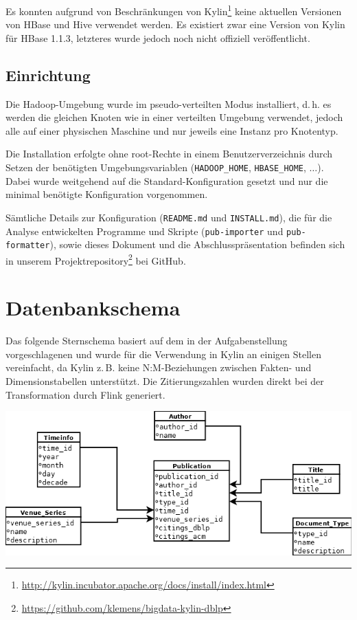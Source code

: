 \documentclass[a4paper,11pt,utf8]{scrartcl}
\begin{document}
\noindent
Es konnten aufgrund von Beschränkungen von Kylin\footnote{\url{http://kylin.incubator.apache.org/docs/install/index.html}} keine aktuellen Versionen von HBase und Hive verwendet werden. Es existiert zwar eine Version von Kylin für HBase 1.1.3, letzteres wurde jedoch noch nicht offiziell veröffentlicht.

\subsection{Einrichtung}

Die Hadoop-Umgebung wurde im pseudo-verteilten Modus installiert, d.\,h. es werden die gleichen Knoten wie in einer verteilten Umgebung verwendet, jedoch alle auf einer physischen Maschine und nur jeweils eine Instanz pro Knotentyp.

Die Installation erfolgte ohne root-Rechte in einem Benutzerverzeichnis durch Setzen der benötigten Umgebungsvariablen (\texttt{HADOOP\_HOME}, \texttt{HBASE\_HOME}, $\dots$). Dabei wurde weitgehend auf die Standard-Konfiguration gesetzt und nur die minimal benötigte Konfiguration vorgenommen.

Sämtliche Details zur Konfiguration (\texttt{README.md} und \texttt{INSTALL.md}), die für die Analyse entwickelten Programme und Skripte (\texttt{pub-importer} und \texttt{pub-formatter}), sowie dieses Dokument und die Abschlusspräsentation befinden sich in unserem Projektrepository\footnote{\url{https://github.com/klemens/bigdata-kylin-dblp}} bei GitHub.

\section{Datenbankschema}

Das folgende Sternschema basiert auf dem in der Aufgabenstellung vorgeschlagenen und wurde für die Verwendung in Kylin an einigen Stellen vereinfacht, da Kylin z.\,B. keine N:M-Beziehungen zwischen Fakten- und Dimensionstabellen unterstützt. Die Zitierungszahlen wurden direkt bei der Transformation durch Flink generiert.

\noindent
\includegraphics[width=\textwidth]{pics/Star-Schema-final}
\end{document}
